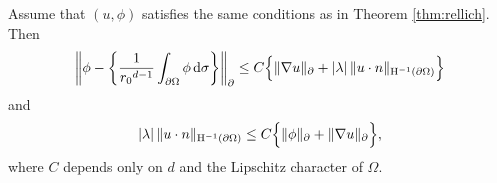 \begin{lem}
  Assume that $(u,\phi)$ satisfies the same conditions as in Theorem \ref{thm:rellich}.
  Then
  \begin{align}
    \label{eq:phiDashintPhi}
    \bigg\|\phi - \bigg\{ \frac{1}{{r_0}^{d - 1}}\int_{\partial\Omega} \phi \, {\operatorname{d}\!{\sigma}} \bigg\} \bigg\|_\partial 
     \leq C \Big\{ \|\nabla u\|_\partial + |\lambda| \, \|u\cdot n\|_{\mathrm{H}^{-1}(\partial\Omega)} \Big\}
  \end{align}
  and
  \begin{align}
    \label{eq:lambdaun}
    |\lambda|\, \| u\cdot n \|_{\mathrm{H}^{-1}(\partial\Omega)} \leq C \Big\{ \|\phi\|_\partial + \|\nabla u\|_\partial \Big\},
  \end{align}
  where $C$ depends only on $d$ and the Lipschitz character of $\Omega$.
\end{lem}

